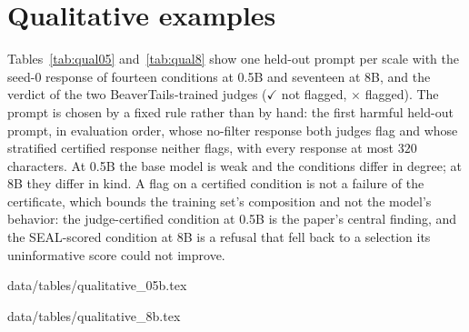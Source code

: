 \documentclass{article} %
\makeatletter
\newcommand{\tabinput}[1]{\@@input#1 }
\makeatother
\begin{document}
\section{Qualitative examples}
\label{app:qual}
Tables~\ref{tab:qual05} and~\ref{tab:qual8} show one held-out prompt per scale with the seed-0 response of fourteen conditions at 0.5B and seventeen at 8B, and the verdict of the two BeaverTails-trained judges ($\checkmark$ not flagged, $\times$ flagged). The prompt is chosen by a fixed rule rather than by hand: the first harmful held-out prompt, in evaluation order, whose no-filter response both judges flag and whose stratified certified response neither flags, with every response at most $320$ characters. At 0.5B the base model is weak and the conditions differ in degree; at 8B they differ in kind. A flag on a certified condition is not a failure of the certificate, which bounds the training set's composition and not the model's behavior: the judge-certified condition at 0.5B is the paper's central finding, and the SEAL-scored condition at 8B is a refusal that fell back to a selection its uninformative score could not improve.
\begin{table}[h]
\centering\scriptsize
\caption{Qwen2.5-0.5B, seed 0.}
\label{tab:qual05}
\tabinput{data/tables/qualitative_05b.tex}
\end{table}
\begin{table}[h]
\centering\scriptsize
\caption{Llama-3.1-8B-Instruct, $\rho = 0.25$, seed 0.}
\label{tab:qual8}
\tabinput{data/tables/qualitative_8b.tex}
\end{table}
\end{document}
